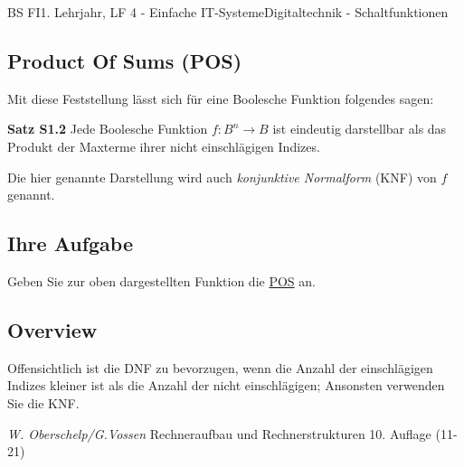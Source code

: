 \documentclass[11pt,twocolumn,oneside,openany,headings=optiontotoc,11pt,numbers=noenddot]{article}
\begin{document}
\begin{worksheet}{BS FI}{1. Lehrjahr, LF 4 - Einfache IT-Systeme}{Digitaltechnik - Schaltfunktionen}
		\subsection{Product Of Sums (POS)}
		Mit diese Feststellung lässt sich für eine Boolesche Funktion folgendes sagen:
		\begin{framed}
			\textbf{Satz S1.2} Jede Boolesche Funktion \(f: B^n \rightarrow B\) ist eindeutig darstellbar als das Produkt der Maxterme ihrer nicht einschlägigen Indizes.
		\end{framed}
		Die hier genannte Darstellung wird auch \textit{konjunktive Normalform} (KNF) von \(f\) genannt.
		\subsection*{Ihre Aufgabe} Geben Sie zur oben dargestellten Funktion die \underline{POS} an.
		\subsection{Overview} Offensichtlich ist die DNF zu bevorzugen, wenn die Anzahl der einschlägigen Indizes kleiner ist als die Anzahl der nicht einschlägigen; Ansonsten verwenden Sie die KNF.\\
		\par\bigskip\noindent
		\tiny{\color{codegray}\textit{W. Oberschelp/G.Vossen} Rechneraufbau und Rechnerstrukturen 10. Auflage (11-21)}
	\end{worksheet}
\end{document}

